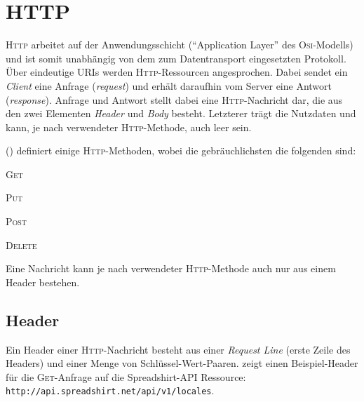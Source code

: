 \section{HTTP}
\label{sec:http}


\textsc{Http} arbeitet auf der Anwendungsschicht (\enquote{Application Layer} des \textsc{Osi}-Modells) und ist somit unabhängig von dem zum Datentransport eingesetzten Protokoll. 
Über eindeutige \glspl{URI} werden \textsc{Http}-Ressourcen angesprochen. Dabei sendet ein \emph{Client} eine Anfrage (\emph{request}) und erhält daraufhin vom Server eine Antwort (\emph{response}). Anfrage und Antwort stellt dabei eine \textsc{Http}-Nachricht dar, die aus den zwei Elementen \emph{Header} und \emph{Body} besteht. Letzterer trägt die Nutzdaten und kann, je nach verwendeter \textsc{Http}-Methode, auch leer sein.

 (\cite{rfc2616}) definiert einige \textsc{Http}-Methoden, wobei die gebräuchlichsten die folgenden sind:
\begin{compactitem}
    \item \textsc{Get}
    \item \textsc{Put}
    \item \textsc{Post}
    \item \textsc{Delete}
\end{compactitem}

Eine Nachricht kann je nach verwendeter \textsc{Http}-Methode auch nur aus einem Header bestehen.

\subsection{Header}
\label{sec:http-header}

Ein Header einer \textsc{Http}-Nachricht besteht aus einer \emph{Request Line} (erste Zeile des Headers) und einer Menge von Schlüssel-Wert-Paaren.  zeigt einen Beispiel-Header für die \textsc{Get}-Anfrage auf die Spreadshirt-\gls{API} Ressource:
\texttt{http://api.spreadshirt.net/api/v1/locales}.


